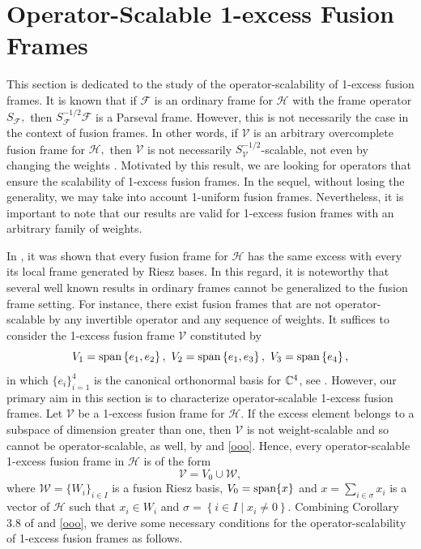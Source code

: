 \documentclass[sn-mathphys-num]{sn-jnl}%
\theoremstyle{definition}
\theoremstyle{remark}
\numberwithin{equation}{section}
\begin{document}
\section{Operator-Scalable 1-excess Fusion Frames}

This section is dedicated to the study of the operator-scalability of 1-excess fusion frames. It is known that if $\mathcal{F}$ is an ordinary frame for $\mathcal {H}$ with the frame operator $S_{\mathcal{F}},$ then $S_{\mathcal{F}}^{-1/2}\mathcal{F}$ is a Parseval frame. However, this is not necessarily the case in the context of fusion frames. In other words, if $\mathcal{V}$ is an arbitrary overcomplete fusion frame for $\mathcal {H},$ then $\mathcal{V}$ is not necessarily $S_{\mathcal{V}}^{-1/2}$-scalable, not even by changing the weights \cite{Excess 1}. Motivated by this result, we are looking for operators that ensure the scalability of 1-excess fusion frames. In the sequel, without losing the generality, we may take into account 1-uniform fusion frames. Nevertheless, it is important to note that our results are valid for 1-excess fusion frames with an arbitrary family of weights. 

In \cite{excess of fusion}, it was shown that every fusion frame for $\mathcal {H}$ has the same excess with every its local frame generated by Riesz bases. In this regard, it is noteworthy that several well known results in ordinary frames cannot be generalized to the fusion frame setting. For instance, there exist fusion frames that are not operator-scalable by any invertible operator and any sequence of weights. It suffices to consider the 1-excess fusion frame $\mathcal{V}$ constituted by 
\begin{equation*}
V_{1}=\textnormal{span}\left\lbrace e_{1},e_{2}\right\rbrace ,~V_{2}=\textnormal{span}\left\lbrace e_{1},e_{3}\right\rbrace ,~V_{3}=\textnormal{span}\left\lbrace e_{4}\right\rbrace ,
\end{equation*}
in which $\{e_{i}\}_{i=1}^4$ is the canonical orthonormal basis for $\Bbb{C}^{4}$, see \cite[Example 7.6]{Excess 1}.
However, our primary aim in this section is to characterize operator-scalable 1-excess fusion frames. Let $\mathcal{V}$ be a 1-excess fusion frame for $\mathcal {H}$. If the excess element belongs to a subspace of dimension greater than one, then $\mathcal{V}$ is not weight-scalable and so cannot be operator-scalable, as well, by \cite[Theorem 3.6]{scaling weights} and \eqref{ooo}. Hence, every operator-scalable 1-excess fusion frame in $\mathcal {H}$ is of the form
\begin{equation}\label{every 1 excess}
\mathcal{V}= V_{0} \cup \mathcal{W},
\end{equation}
where $\mathcal{W}=\{W_{i}\}_{i \in I}$ is a fusion Riesz basis, $V_{0}=\textnormal{span}\{x\}$ and $x =\sum_{i \in \sigma} x_{i}$ is a vector of $\mathcal {H}$ such that $x_{i} \in W_{i}$ and $\sigma=\left\lbrace i \in I\mid x_{i}\neq0 \right\rbrace $. Combining Corollary 3.8 of \cite{scaling weights} and \eqref{ooo}, we derive some necessary conditions for the operator-scalability of 1-excess fusion frames as follows.
\end{document}
